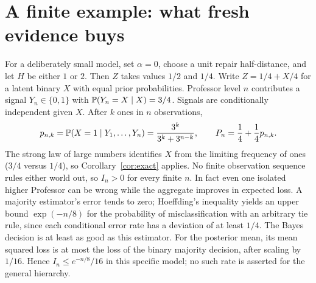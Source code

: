 \documentclass[11pt,letterpaper]{article}
\theoremstyle{definition}\newtheorem{definition}[theorem]{Definition}\newtheorem{example}[theorem]{Example}\newtheorem{conjecture}[theorem]{Conjecture}
\begin{document}
\section{A finite example: what fresh evidence buys}
For a deliberately small model, set $\alpha=0$, choose a unit repair half-distance, and let $H$ be either $1$ or $2$. Then $Z$ takes values $1/2$ and $1/4$. Write $Z=1/4+X/4$ for a latent binary $X$ with equal prior probabilities. Professor level $n$ contributes a signal $Y_n\in\{0,1\}$ with $\mathbb P(Y_n=X\mid X)=3/4$. Signals are conditionally independent given $X$. After $k$ ones in $n$ observations,
\[
 p_{n,k}=\mathbb P(X=1\mid Y_1,\ldots,Y_n)
 =\frac{3^k}{3^k+3^{n-k}},\qquad P_n=\frac14+\frac14p_{n,k}.
\]
The strong law of large numbers identifies $X$ from the limiting frequency of ones ($3/4$ versus $1/4$), so Corollary~\ref{cor:exact} applies. No finite observation sequence rules either world out, so $I_n>0$ for every finite $n$. In fact even one isolated higher Professor can be wrong while the aggregate improves in expected loss. A majority estimator's error tends to zero; Hoeffding's inequality yields an upper bound $\exp(-n/8)$ for the probability of misclassification with an arbitrary tie rule, since each conditional error rate has a deviation of at least $1/4$. The Bayes decision is at least as good as this estimator. For the posterior mean, its mean squared loss is at most the loss of the binary majority decision, after scaling by $1/16$. Hence $I_n\leq e^{-n/8}/16$ in this specific model; no such rate is asserted for the general hierarchy.
\end{document}
